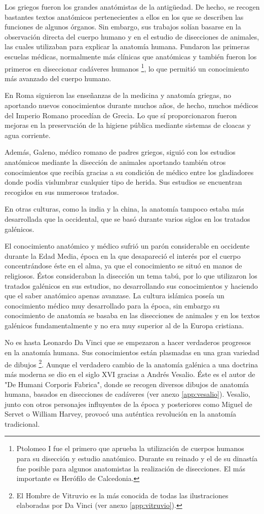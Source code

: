 Los griegos fueron los grandes anatómistas de la antigüedad. De hecho, se recogen bastantes textos anatómicos pertenecientes a ellos en los que se describen las funciones de algunos órganos. Sin embargo, sus trabajos solían basarse en la observación directa del cuerpo humano y en el estudio de disecciones de animales, las cuales utilizaban para explicar la anatomía humana. Fundaron las primeras escuelas médicas, normalmente más clínicas que anatómicas y también fueron los primeros en diseccionar cadáveres humanos \footnote{Ptolomeo I fue el primero que aprueba la utilización de cuerpos humanos para su disección y estudio anatómico. Durante su reinado y el de su dinastía fue posible para algunos anatomistas la realización de disecciones. El más importante es Herófilo de Calcedonia.}, lo que permitió un conocimiento más avanzado del cuerpo humano.

En Roma siguieron las enseñanzas de la medicina y anatomía griegas, no aportando nuevos conocimientos durante muchos años, de hecho, muchos médicos del Imperio Romano procedían de Grecia. Lo que sí proporcionaron fueron mejoras en la preservación de la higiene pública mediante sistemas de cloacas y agua corriente.

Además, Galeno, médico romano de padres griegos, siguió con los estudios anatómicos mediante la disección de animales aportando también otros conocimientos que recibía gracias a su condición de médico entre los gladiadores donde podía vislumbrar cualquier tipo de herida. Sus estudios se encuentran recogidos en sus numerosos tratados.

En otras culturas, como la india y la china, la anatomía tampoco estaba más desarrollada que la occidental, que se basó durante varios siglos en los tratados galénicos.

El conocimiento anatómico y médico sufrió un parón considerable en occidente durante la Edad Media, época en la que desapareció el interés por el cuerpo concentrándose éste en el alma, ya que el conocimiento se situó en manos de religiosos. Éstos consideraban la disección un tema tabú, por lo que utilizaron los tratados galénicos en sus estudios, no desarrollando sus conocimientos y haciendo que el saber anatómico apenas avanzase. La cultura islámica poseía un conocimiento médico muy desarrollado para la época, sin embargo su conocimiento de anatomía se basaba en las disecciones de animales y en los textos galénicos fundamentalmente y no era muy superior al de la Europa cristiana.

No es hasta Leonardo Da Vinci que se empezaron a hacer verdaderos progresos en la anatomía humana. Sus conocimientos están plasmadas en una gran variedad de dibujos \footnote{El Hombre de Vitruvio es la más conocida de todas las ilustraciones elaboradas por Da Vinci (ver anexo \autoref{app:vitruvio}).}. Aunque el verdadero cambio de la anatomía galénica a una doctrina más moderna se dio en el siglo XVI gracias a Andrés Vesalio. Éste es el autor de "De Humani Corporis Fabrica", donde se recogen diversos dibujos de anatomía humana, basados en disecciones de cadáveres (ver anexo \autoref{app:vesalio}). Vesalio, junto con otros personajes influyentes de la época y posteriores como Miguel de Servet o William Harvey, provocó una auténtica revolución en la anatomía tradicional.

